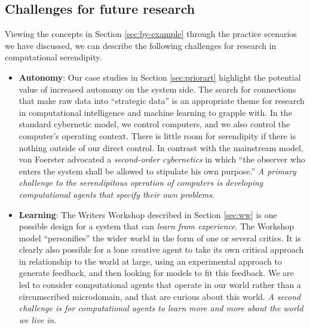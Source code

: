 \subsection{Challenges for future research} \label{sec:recommendations}

Viewing the concepts in Section \ref{sec:by-example} through the
practice scenarios we have discussed, we can describe the following
challenges for research in computational serendipity.

\begin{itemize}
\item \textbf{Autonomy}: Our case studies in Section \ref{sec:priorart} highlight the potential value of increased autonomy on the system side.
The search for connections that make raw data into ``strategic data''
is an appropriate theme for research in computational intelligence and
machine learning to grapple with.  In the standard cybernetic model,
we control computers, and we also control the computer's operating
context.  There is little room for serendipity if there is nothing
outside of our direct control.  In contrast with the mainstream model,
von Foerster \citeyear[p. 286]{von2003cybernetics} advocated a
\emph{second-order cybernetics} in which ``the observer who enters the
system shall be allowed to stipulate his own purpose.''  \emph{A
  primary challenge to the serendipitous operation of computers is
  developing computational agents that specify their own problems.}
\end{itemize}

\begin{itemize}
\item \textbf{Learning}: The Writers Workshop described in Section
  \ref{sec:ww} is one possible design for a system
  that can \emph{learn from experience}.  The Workshop model
  ``personifies'' the wider world in the form of one or several
  critics.  It is clearly also possible for a lone creative agent to
  take its own critical approach in relationship to the world at
  large, using an experimental approach to generate feedback, and then
  looking for models to fit this feedback.   We are led to consider 
  computational agents that operate in our world rather
  than a circumscribed microdomain, and that are curious about this
  world.  \emph{A second challenge is for computational agents to
    learn more and more about the world we live in.}
\end{itemize}


